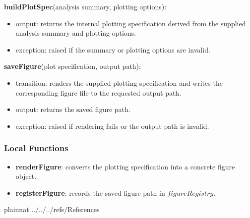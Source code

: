 \documentclass[12pt, titlepage]{article}
\begin{document}
\noindent \textbf{buildPlotSpec}(analysis summary, plotting options):
\begin{itemize}
    \item output: returns the internal plotting specification derived from the supplied analysis summary and plotting options.
    \item exception: raised if the summary or plotting options are invalid.
\end{itemize}

\noindent \textbf{saveFigure}(plot specification, output path):
\begin{itemize}
    \item transition: renders the supplied plotting specification and writes the corresponding figure file to the requested output path.
    \item output: returns the saved figure path.
    \item exception: raised if rendering fails or the output path is invalid.
\end{itemize}

\subsubsection{Local Functions}

\begin{itemize}
    \item \textbf{renderFigure}: converts the plotting specification into a concrete figure object.
    \item \textbf{registerFigure}: records the saved figure path in $figureRegistry$.
\end{itemize}







 {plainnat}
 {../../../refs/References}















\newpage


\end{document}
